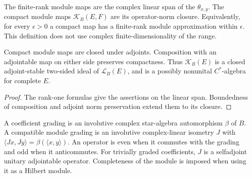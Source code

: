 \begin{definition}\label{def:compact-module-operators}
\leanok
The finite-rank module maps are the complex linear span of the $\theta_{x,y}$.
The compact module maps $\mathcal K_B(E,F)$ are its operator-norm closure.
Equivalently, for every $\epsilon>0$ a compact map has a finite-rank module
approximation within $\epsilon$. This definition does not use complex
finite-dimensionality of the range.
\end{definition}

\begin{proposition}\label{prop:compact-module-ideal}
\leanok
Compact module maps are closed under adjoints. Composition with an
adjointable map on either side preserves compactness. Thus
$\mathcal K_B(E)$ is a closed adjoint-stable two-sided ideal of
$\mathcal L_B(E)$, and is a possibly nonunital $C^*$-algebra for complete $E$.
\end{proposition}
\begin{proof}\leanok
The rank-one formulas give the assertions on the linear span. Boundedness
of composition and adjoint norm preservation extend them to its closure.
\end{proof}

\begin{definition}\label{def:module-gradings}
\leanok
A coefficient grading is an involutive complex star-algebra automorphism
$\beta$ of $B$. A compatible module grading is an involutive complex-linear
isometry $J$ with $\langle Jx,Jy\rangle=\beta(\langle x,y\rangle)$.
An operator is even when it commutes with the grading and odd when it
anticommutes. For trivially graded coefficients, $J$ is a selfadjoint unitary
adjointable operator. Completeness of the module is imposed when using it as
a Hilbert module.
\end{definition}

